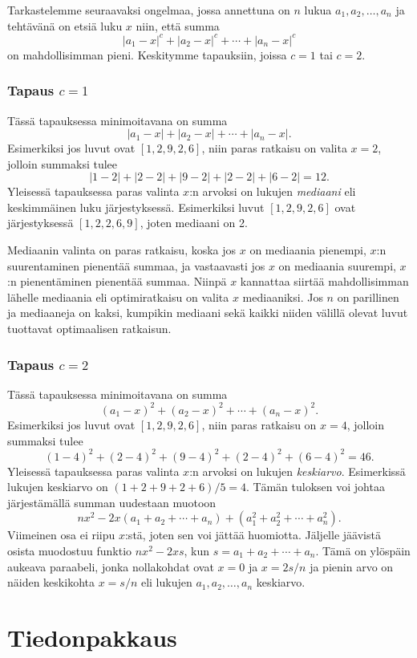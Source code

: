Tarkastelemme seuraavaksi ongelmaa, jossa
annettuna on $n$ lukua $a_1,a_2,\ldots,a_n$
ja tehtävänä on etsiä luku $x$ niin, että summa
\[|a_1-x|^c+|a_2-x|^c+\cdots+|a_n-x|^c\]
on mahdollisimman pieni.
Keskitymme tapauksiin, joissa $c=1$ tai $c=2$.

\subsubsection{Tapaus $c=1$}

Tässä tapauksessa minimoitavana on summa
\[|a_1-x|+|a_2-x|+\cdots+|a_n-x|.\]
Esimerkiksi jos luvut ovat $[1,2,9,2,6]$,
niin paras ratkaisu on valita $x=2$,
jolloin summaksi tulee
\[
|1-2|+|2-2|+|9-2|+|2-2|+|6-2|=12.
\]
Yleisessä tapauksessa paras valinta $x$:n arvoksi
on lukujen \textit{mediaani}
eli keskimmäinen luku järjestyksessä.
Esimerkiksi luvut $[1,2,9,2,6]$
ovat järjestyksessä $[1,2,2,6,9]$,
joten mediaani on 2.

Mediaanin valinta on paras ratkaisu,
koska jos $x$ on mediaania pienempi,
$x$:n suurentaminen pienentää summaa,
ja vastaavasti jos $x$ on mediaania suurempi,
$x$:n pienentäminen pienentää summaa.
Niinpä $x$ kannattaa siirtää mahdollisimman
lähelle mediaania eli optimiratkaisu on
valita $x$ mediaaniksi.
Jos $n$ on parillinen ja mediaaneja on kaksi,
kumpikin mediaani sekä kaikki niiden välillä
olevat luvut tuottavat optimaalisen ratkaisun.

\subsubsection{Tapaus $c=2$}

Tässä tapauksessa minimoitavana on summa
\[(a_1-x)^2+(a_2-x)^2+\cdots+(a_n-x)^2.\]
Esimerkiksi jos luvut ovat $[1,2,9,2,6]$,
niin paras ratkaisu on $x=4$,
jolloin summaksi tulee
\[
(1-4)^2+(2-4)^2+(9-4)^2+(2-4)^2+(6-4)^2=46.
\]
Yleisessä tapauksessa paras valinta $x$:n arvoksi on lukujen
\textit{keskiarvo}.
Esimerkissä lukujen keskiarvo on $(1+2+9+2+6)/5=4$.
Tämän tuloksen voi johtaa järjestämällä summan
uudestaan muotoon
\[
nx^2 - 2x(a_1+a_2+\cdots+a_n) + (a_1^2+a_2^2+\cdots+a_n^2).
\]
Viimeinen osa ei riipu $x$:stä, joten sen voi jättää huomiotta.
Jäljelle jäävistä osista muodostuu funktio
$nx^2-2xs$, kun $s=a_1+a_2+\cdots+a_n$.
Tämä on ylöspäin aukeava paraabeli,
jonka nollakohdat ovat $x=0$ ja $x=2s/n$
ja pienin arvo on näiden keskikohta
$x=s/n$ eli lukujen $a_1,a_2,\ldots,a_n$ keskiarvo.

\section{Tiedonpakkaus}

